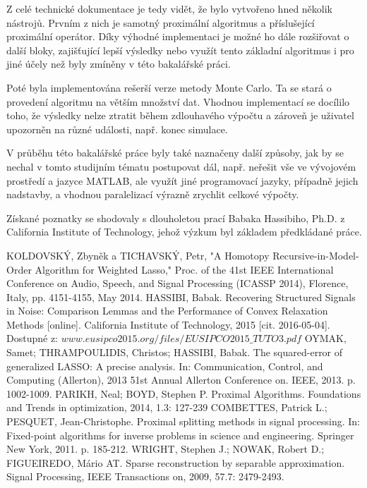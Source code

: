 \documentclass[FM,BP]{tulthesis}
\begin{document}
Z celé technické dokumentace je tedy vidět, že bylo vytvořeno hned několik nástrojů. Prvním z nich je samotný proximální algoritmus a příslušející proximální operátor. Díky výhodné implementaci je možné ho dále rozšiřovat o další bloky, zajišťující lepší výsledky nebo využít tento základní algoritmus i pro jiné účely než byly zmíněny v této bakalářské práci. 

Poté byla implementována rešerší verze metody Monte Carlo. Ta se stará o provedení algoritmu na větším množství dat. Vhodnou implementací se docílilo toho, že výsledky nelze ztratit během zdlouhavého výpočtu a zároveň je uživatel upozorněn na různé události, např. konec simulace.

V průběhu této bakalářské práce byly také naznačeny další způsoby, jak by se nechal v tomto studijním tématu postupovat dál, např. neřešit vše ve vývojovém prostředí a jazyce MATLAB, ale využít jiné programovací jazyky, případně jejich nadstavby, a vhodnou paralelizací výrazně zrychlit celkové výpočty. 

Získané poznatky se shodovaly s dlouholetou prací Babaka Hassibiho, Ph.D. z California Institute of Technology, jehož výzkum byl základem předkládané práce.

\renewcommand{\bibname}{Literatura}
\begin{thebibliography}{99}
KOLDOVSKÝ, Zbyněk a TICHAVSKÝ, Petr, "A Homotopy Recursive-in-Model-Order Algorithm for Weighted Lasso," Proc. of the 41st IEEE International Conference on Audio, Speech, and Signal Processing (ICASSP 2014), Florence, Italy, pp. 4151-4155, May 2014.
HASSIBI, Babak. Recovering Structured Signals in Noise: Comparison Lemmas and the Performance of Convex Relaxation Methods [online]. California Institute of Technology, 2015 [cit. 2016-05-04]. Dostupné z: $www.eusipco2015.org/files/EUSIPCO2015\_TUTO3.pdf$
OYMAK, Samet; THRAMPOULIDIS, Christos; HASSIBI, Babak. The squared-error of generalized LASSO: A precise analysis. In: Communication, Control, and Computing (Allerton), 2013 51st Annual Allerton Conference on. IEEE, 2013. p. 1002-1009.
PARIKH, Neal; BOYD, Stephen P. Proximal Algorithms. Foundations and Trends in optimization, 2014, 1.3: 127-239
COMBETTES, Patrick L.; PESQUET, Jean-Christophe. Proximal splitting methods in signal processing. In: Fixed-point algorithms for inverse problems in science and engineering. Springer New York, 2011. p. 185-212.
WRIGHT, Stephen J.; NOWAK, Robert D.; FIGUEIREDO, Mário AT. Sparse reconstruction by separable approximation. Signal Processing, IEEE Transactions on, 2009, 57.7: 2479-2493.
\end{thebibliography}
\clearpage
\appendix
\captionsetup[figure]{list=no}
\end{document}
